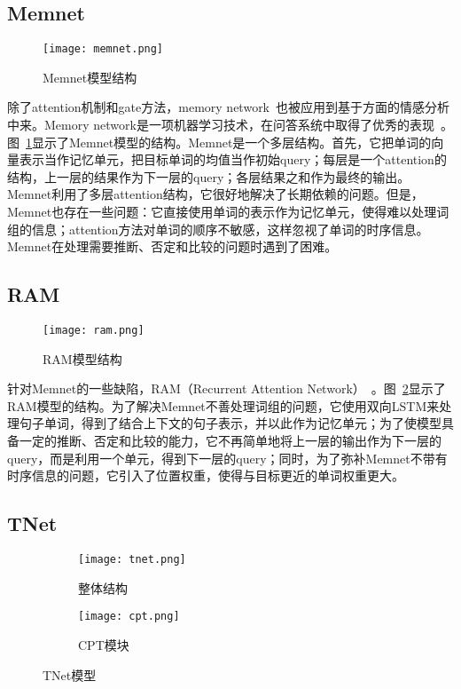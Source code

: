 \subsection{Memnet}

\begin{figure}[ht]
    \centering 
    \texttt{[image: memnet.png]}
    \caption{Memnet模型结构}
    \label{fig:memnet}
\end{figure}

除了attention机制和gate方法，memory network~\cite{Weston2014Memory}也被应用到基于方面的情感分析中来。Memory network是一项机器学习技术，在问答系统中取得了优秀的表现~\cite{Weston2014Memory,Sukhbaatar2015End}。图~\ref{fig:memnet}显示了Memnet模型的结构。Memnet是一个多层结构。首先，它把单词的向量表示当作记忆单元，把目标单词的均值当作初始query；每层是一个attention的结构，上一层的结果作为下一层的query；各层结果之和作为最终的输出。Memnet利用了多层attention结构，它很好地解决了长期依赖的问题。但是，Memnet也存在一些问题：它直接使用单词的表示作为记忆单元，使得难以处理词组的信息；attention方法对单词的顺序不敏感，这样忽视了单词的时序信息。Memnet在处理需要推断、否定和比较的问题时遇到了困难。

\subsection{RAM}

\begin{figure}[ht]
    \centering 
    \texttt{[image: ram.png]}
    \caption{RAM模型结构}
    \label{fig:ram}
\end{figure}

针对Memnet的一些缺陷，RAM（Recurrent Attention Network）~\cite{Al2017Deep}。图~\ref{fig:ram}显示了RAM模型的结构。为了解决Memnet不善处理词组的问题，它使用双向LSTM来处理句子单词，得到了结合上下文的句子表示，并以此作为记忆单元；为了使模型具备一定的推断、否定和比较的能力，它不再简单地将上一层的输出作为下一层的query，而是利用一个\cite{cho2014learning}单元，得到下一层的query；同时，为了弥补Memnet不带有时序信息的问题，它引入了位置权重，使得与目标更近的单词权重更大。

\subsection{TNet}

\begin{figure}[h]
	\centering%
	\begin{subfigure}{0.5\textwidth}
		\centering
		\texttt{[image: tnet.png]}
		\caption{整体结构}
	\end{subfigure}%
	\begin{subfigure}{0.5\textwidth}
		\centering
		\texttt{[image: cpt.png]}
		\caption{CPT模块}
	\end{subfigure}
	\caption{TNet模型}
	\label{fig:tnet}
\end{figure}


